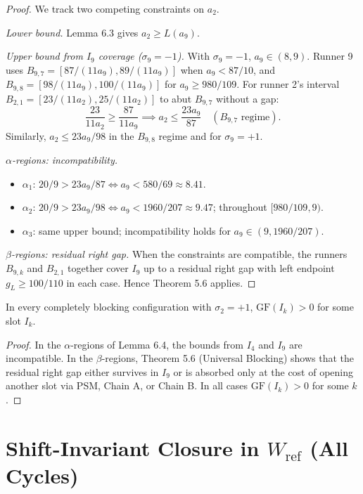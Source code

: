 \documentclass[12pt]{article}
\begin{document}
\begin{proof}
We track two competing constraints on $a_2$.

\emph{Lower bound.} Lemma 6.3 gives $a_2\ge L(a_9)$.

\emph{Upper bound from $I_9$ coverage ($\sigma_9=-1$).} With $\sigma_9=-1$,
$a_9\in(8,9)$. Runner 9 uses $B_{9,7}=[87/(11a_9),89/(11a_9)]$ when $a_9<87/10$, and
$B_{9,8}=[98/(11a_9),100/(11a_9)]$ for $a_9\ge 980/109$. For runner 2's interval
$B_{2,1}=[23/(11a_2),25/(11a_2)]$ to abut $B_{9,7}$ without a gap:
\[
\frac{23}{11a_2}\ge \frac{87}{11a_9} \implies a_2\le\frac{23a_9}{87}\quad
  (B_{9,7}\text{ regime}).
\]
Similarly, $a_2\le 23a_9/98$ in the $B_{9,8}$ regime and for $\sigma_9=+1$.

\emph{$\alpha$-regions: incompatibility.}
\begin{itemize}
\item $\alpha_1$: $20/9>23a_9/87\iff a_9<580/69\approx 8.41$.
\item $\alpha_2$: $20/9>23a_9/98\iff a_9<1960/207\approx 9.47$; throughout $[980/109,9)$.
\item $\alpha_3$: same upper bound; incompatibility holds for $a_9\in(9,1960/207)$.
\end{itemize}

\emph{$\beta$-regions: residual right gap.} When the constraints are compatible, the runners
$B_{9,k}$ and $B_{2,1}$ together cover $I_9$ up to a residual right gap with left endpoint
$g_L\ge 100/110$ in each case. Hence Theorem 5.6 applies.
\end{proof}

\begin{theorem}\label{t:65}
In every completely blocking configuration
with $\sigma_2=+1$, $\mathrm{GF}(I_k)>0$ for some slot $I_k$.

\end{theorem}
\begin{proof}
In the $\alpha$-regions of Lemma 6.4, the bounds from $I_4$ and $I_9$ are
incompatible. In the $\beta$-regions, Theorem 5.6 (Universal Blocking) shows that
the residual right gap either survives in $I_9$ or is absorbed only at the cost of opening
another slot via PSM, Chain A, or Chain B. In all cases $\mathrm{GF}(I_k)>0$ for some $k$.
\end{proof}



\section{Shift-Invariant Closure in \texorpdfstring{$W_{\mathrm{ref}}$}{W\_ref} (All Cycles)}
\end{document}
